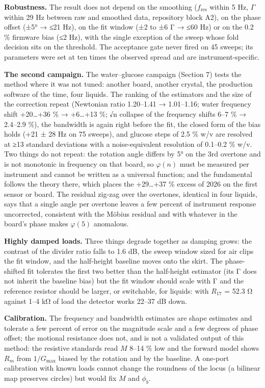 \documentclass[11pt,a4paper]{article}
\begin{document}
\textbf{Robustness.} The result does not depend on the smoothing
(\(f_\mathrm{res}\) within 5 Hz, \(\Gamma\) within 29 Hz between raw and
smoothed data, repository block A2), on the phase offset (±5° → ≤21 Hz),
on the fit window (±2 to ±6 Γ → ≤60 Hz) or on the 0.2 \% firmware bias
(≤2 Hz), with the single exception of the sweep whose fold decision sits
on the threshold. The acceptance gate never fired on 45 sweeps; its
parameters were set at ten times the observed spread and are
instrument-specific.

\textbf{The second campaign.} The water--glucose campaign (Section 7)
tests the method where it was not tuned: another board, another crystal,
the production software of the time, four liquids. The ranking of the
estimators and the size of the correction repeat (Newtonian ratio
1.20--1.41 → 1.01--1.16; water frequency shift +20\ldots+36 \% →
+6\ldots+13 \%; √n collapse of the frequency shifts 6--7 \% → 2.4--2.9
\%), the bandwidth is again right before the fit, the closed form of the
bias holds (+21 ± 28 Hz on 75 sweeps), and glucose steps of 2.5 \% w/v
are resolved at ≥13 standard deviations with a noise-equivalent
resolution of 0.1--0.2 \% w/v. Two things do not repeat: the rotation
angle differs by 5° on the 3rd overtone and is not monotonic in
frequency on that board, so \(\varphi(n)\) must be measured per
instrument and cannot be written as a universal function; and the
fundamental follows the theory there, which places the +29\ldots+37 \%
excess of 2026 on the first sensor or board. The residual zig-zag over
the overtones, identical in four liquids, says that a single angle per
overtone leaves a few percent of instrument response uncorrected,
consistent with the Möbius residual and with whatever in the board's
phase makes \(\varphi(5)\) anomalous.

\textbf{Highly damped loads.} Three things degrade together as damping
grows: the contrast of the divider ratio falls to 1.6 dB, the sweep
window sized for air clips the fit window, and the half-height baseline
moves onto the skirt. The phase-shifted fit tolerates the first two
better than the half-height estimator (its Γ does not inherit the
baseline bias) but the fit window should scale with Γ and the reference
resistor should be larger, or switchable, for liquids: with \(R_{17}\) =
52.3 Ω against 1--4 kΩ of load the detector works 22--37 dB down.

\textbf{Calibration.} The frequency and bandwidth estimates are shape
estimates and tolerate a few percent of error on the magnitude scale and
a few degrees of phase offset; the motional resistance does not, and is
not a validated output of this method: the resistive standards read
\(M\) 8--14 \% low and the forward model shows \(R_m\) from
\(1/G_\mathrm{max}\) biased by the rotation and by the baseline. A
one-port calibration with known loads cannot change the roundness of the
locus (a bilinear map preserves circles) but would fix \(M\) and
\(\phi_b\).
\end{document}

